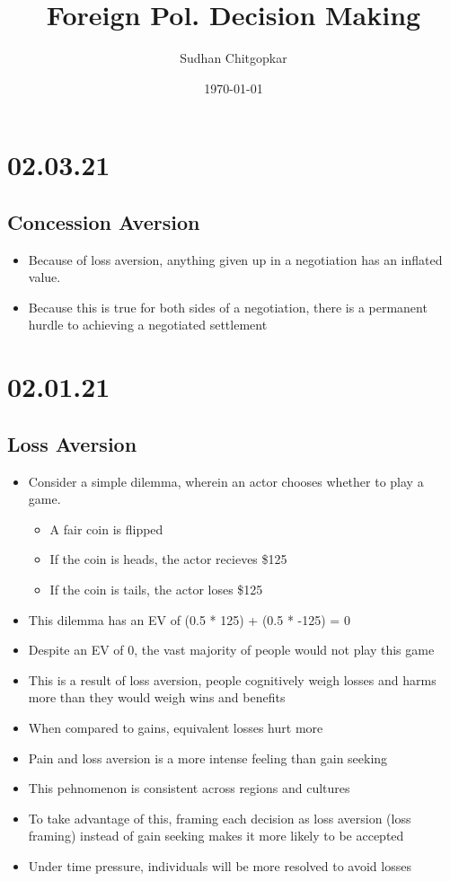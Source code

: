 \documentclass[11pt]{article}
\author{Sudhan Chitgopkar}
\date{\today}
\title{Foreign Pol. Decision Making}
\begin{document}
\maketitle
\section*{02.03.21}
\label{sec:org96fac60}
\subsection*{Concession Aversion}
\label{sec:org36b14ab}
\begin{itemize}
\item Because of loss aversion, anything given up in a negotiation has an inflated value.
\item Because this is true for both sides of a negotiation, there is a permanent hurdle to achieving a negotiated settlement
\end{itemize}
\section*{02.01.21}
\label{sec:orge9b4cc0}
\subsection*{Loss Aversion}
\label{sec:org40adcfc}
\begin{itemize}
\item Consider a simple dilemma, wherein an actor chooses whether to play a game.
\begin{itemize}
\item A fair coin is flipped
\item If the coin is heads, the actor recieves \$125
\item If the coin is tails, the actor loses \$125
\end{itemize}
\item This dilemma has an EV of (0.5 * 125) + (0.5 * -125) = 0
\item Despite an EV of 0, the vast majority of people would not play this game
\item This is a result of loss aversion, people cognitively weigh losses and harms more than they would weigh wins and benefits
\item When compared to gains, equivalent losses hurt more
\item Pain and loss aversion is a more intense feeling than gain seeking
\item This pehnomenon is consistent across regions and cultures
\item To take advantage of this, framing each decision as loss aversion (loss framing) instead of gain seeking makes it more likely to be accepted
\item Under time pressure, individuals will be more resolved to avoid losses
\end{itemize}
\end{document}
